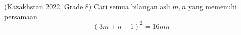 \documentclass[11pt]{scrartcl}
\begin{document}

    
\begin{problem}
    (Kazakhstan 2022, Grade 8) Cari semua bilangan asli $m, n$ yang memenuhi persamaan \[(3m + n + 1)^2 = 16mn\]     
\end{problem}
    
\end{document}
